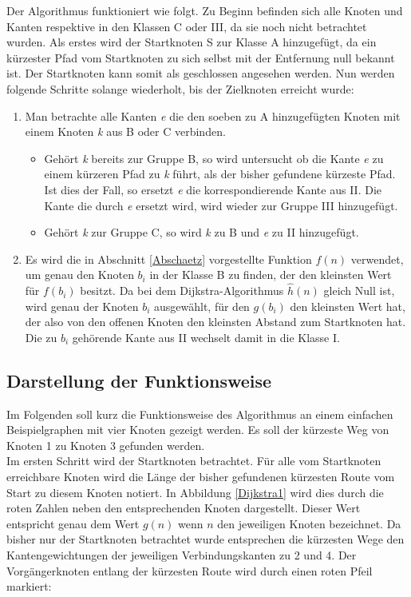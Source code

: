 		Der Algorithmus funktioniert wie folgt. Zu Beginn befinden sich alle Knoten und Kanten respektive in den Klassen C oder III, da sie noch nicht betrachtet wurden. Als erstes wird der Startknoten S zur Klasse A hinzugefügt, da ein kürzester Pfad vom Startknoten zu sich selbst mit der Entfernung null bekannt ist. Der Startknoten kann somit als geschlossen angesehen werden. Nun werden folgende Schritte solange wiederholt, bis der Zielknoten erreicht wurde:
		\begin{center}
			\begin{minipage}{0.8\linewidth}

				\begin{enumerate}
					\item Man betrachte alle Kanten \textit{e} die den soeben zu A hinzugefügten Knoten mit einem Knoten \textit{k} aus B oder C verbinden. 
					\begin{itemize}
						\item Gehört \textit{k} bereits zur Gruppe B, so wird untersucht ob die Kante \textit{e} zu einem kürzeren Pfad zu \textit{k} führt, als der bisher gefundene kürzeste Pfad. Ist dies der Fall, so ersetzt \textit{e} die korrespondierende Kante aus II. Die Kante die durch \textit{e} ersetzt wird, wird wieder zur Gruppe III hinzugefügt.
						\item Gehört \textit{k} zur Gruppe  C, so wird \textit{k} zu B und \textit{e} zu II hinzugefügt.
					\end{itemize}
					\item Es wird die in Abschnitt \ref{Abschaetz} vorgestellte Funktion $f(n)$ verwendet, um genau den Knoten $b_i$ in der Klasse B zu finden, der den kleinsten Wert für $f(b_i)$ besitzt. Da bei dem Dijkstra-Algorithmus $\hat{h}(n)$ gleich Null ist, wird genau der Knoten  $b_i$ ausgewählt, für den $g(b_i)$ den kleinsten Wert hat, der also von den offenen Knoten den kleinsten Abstand zum Startknoten hat. Die zu $b_i$ gehörende Kante  aus II wechselt damit in die Klasse I.
				\end{enumerate}
				
			\end{minipage}
		\end{center}
	\subsection{Darstellung der Funktionsweise}
		Im Folgenden soll kurz die Funktionsweise des Algorithmus an einem einfachen Beispielgraphen mit vier Knoten gezeigt werden. Es soll der kürzeste Weg von Knoten 1 zu Knoten 3 gefunden werden.\\[4pt]
		Im ersten Schritt wird der Startknoten betrachtet. Für alle vom Startknoten erreichbare Knoten wird die Länge der bisher gefundenen kürzesten Route vom Start zu diesem Knoten notiert. In Abbildung \ref{Dijkstra1} wird dies durch die roten Zahlen neben den entsprechenden Knoten dargestellt. Dieser Wert entspricht genau dem Wert $g(n)$ wenn $n$ den jeweiligen Knoten bezeichnet. Da bisher nur der Startknoten betrachtet wurde entsprechen die kürzesten Wege den Kantengewichtungen der jeweiligen Verbindungskanten zu 2 und 4. Der Vorgängerknoten entlang der kürzesten Route wird durch einen roten Pfeil markiert:
		
